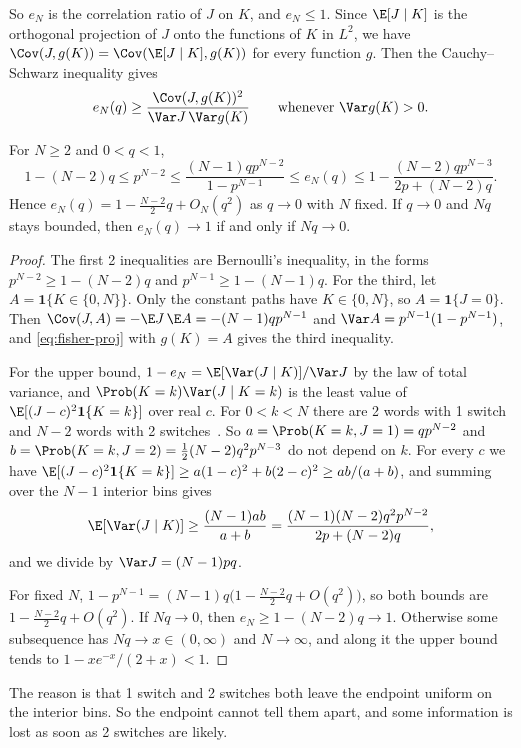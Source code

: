 So $e_N$ is the correlation ratio of $J$ on $K$, and $e_N\le1$. Since
$\E[J\mid K]$ is the orthogonal projection of $J$ onto the functions of $K$
in $L^2$, we have $\Cov(J,g(K))=\Cov(\E[J\mid K],g(K))$ for every function
$g$. Then the Cauchy--Schwarz inequality gives
\begin{equation}\label{eq:fisher-proj}
 e_N(q)\ge\frac{\Cov(J,g(K))^2}{\Var J\,\Var g(K)}
 \qquad\text{whenever }\Var g(K)>0.
\end{equation}

\begin{proposition}\label{prop:smallx}
For $N\ge2$ and $0<q<1$,
\[
 1-(N-2)q\le p^{N-2}\le\frac{(N-1)qp^{N-2}}{1-p^{N-1}}\le e_N(q)
 \le1-\frac{(N-2)qp^{N-3}}{2p+(N-2)q}.
\]
Hence $e_N(q)=1-\frac{N-2}2q+O_N(q^2)$ as $q\to0$ with $N$ fixed. If $q\to0$
and $Nq$ stays bounded, then $e_N(q)\to1$ if and only if $Nq\to0$.
\end{proposition}

\begin{proof}
The first 2 inequalities are Bernoulli's inequality, in the forms
$p^{N-2}\ge1-(N-2)q$ and $p^{N-1}\ge1-(N-1)q$. For the third, let
$A=\mathbf 1\{K\in\{0,N\}\}$. Only the constant paths have $K\in\{0,N\}$,
so $A=\mathbf 1\{J=0\}$. Then $\Cov(J,A)=-\E J\,\E A=-(N-1)qp^{N-1}$ and
$\Var A=p^{N-1}(1-p^{N-1})$, and \eqref{eq:fisher-proj} with $g(K)=A$ gives
the third inequality.

For the upper bound, $1-e_N=\E[\Var(J\mid K)]/\Var J$ by the law of total
variance, and $\Prob(K=k)\Var(J\mid K=k)$ is the least value of
$\E[(J-c)^2\mathbf 1\{K=k\}]$ over real $c$. For $0<k<N$ there are 2 words
with 1 switch and $N-2$ words with 2 switches~\cite[Thm.~2.1]{paperA}.
So $a=\Prob(K=k,J=1)=qp^{N-2}$ and $b=\Prob(K=k,J=2)=\frac12(N-2)q^2p^{N-3}$
do not depend on $k$. For every $c$ we have
$\E[(J-c)^2\mathbf 1\{K=k\}]\ge a(1-c)^2+b(2-c)^2\ge ab/(a+b)$, and summing
over the $N-1$ interior bins gives
\[
 \E[\Var(J\mid K)]\ge\frac{(N-1)ab}{a+b}=\frac{(N-1)(N-2)q^2p^{N-2}}{2p+(N-2)q},
\]
and we divide by $\Var J=(N-1)pq$.

For fixed $N$, $1-p^{N-1}=(N-1)q\bigl(1-\frac{N-2}2q+O(q^2)\bigr)$, so both
bounds are $1-\frac{N-2}2q+O(q^2)$. If $Nq\to0$, then $e_N\ge1-(N-2)q\to1$.
Otherwise some subsequence has $Nq\to x\in(0,\infty)$ and $N\to\infty$, and
along it the upper bound tends to $1-xe^{-x}/(2+x)<1$.
\end{proof}

The reason is that 1 switch and 2 switches both leave the endpoint uniform
on the interior bins. So the endpoint cannot tell them apart, and some
information is lost as soon as 2 switches are likely.

